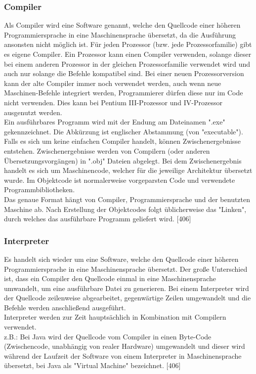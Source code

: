 \documentclass[12pt,a4paper]{report}
\begin{document}
\begin{onehalfspace}
\subsubsection{Compiler}
Als Compiler wird eine Software genannt, welche den Quellcode einer höheren Programmiersprache in eine Maschinensprache übersetzt, da die Ausführung ansonsten nicht möglich ist. Für jeden Prozessor (bzw. jede Prozessorfamilie) gibt es eigene Compiler. Ein Prozessor kann einen Compiler verwenden, solange dieser bei einem anderen Prozessor in der gleichen Prozessorfamilie verwendet wird und auch nur solange die Befehle kompatibel sind. Bei einer neuen Prozessorversion kann der alte Compiler immer noch verwendet werden, auch wenn neue Maschinen-Befehle integriert werden, Programmierer dürfen diese nur im Code nicht verwenden. Dies kann bei Pentium III-Prozessor und IV-Prozessor ausgenutzt werden.\\
Ein ausführbares Programm wird mit der Endung am Dateinamen "{}.exe"{} gekennzeichnet. Die Abkürzung ist englischer Abstammung (von "{}executable"{}).\\
Falls es sich um keine einfachen Compiler handelt, können Zwischenergebnisse entstehen.
Zwischenergebnisse werden von Compilern (oder anderen Übersetzungsvorgängen) in "{}.obj"{} Dateien abgelegt. Bei dem Zwischenergebnis handelt es sich um Maschinencode, welcher für die jeweilige Architektur übersetzt wurde. Im Objektcode ist normalerweise vorgeparsten Code und verwendete Programmbibliotheken.\\
Das genaue Format hängt von Compiler, Programmiersprache und der benutzten Maschine ab.
Nach Erstellung der Objektcodes folgt üblicherweise das "{}Linken"{}, durch welches das ausführbare Programm geliefert wird. [406]

\subsubsection{Interpreter}
Es handelt sich wieder um eine Software, welche den Quellcode einer höheren Programmiersprache in eine Maschinensprache übersetzt. Der große Unterschied ist, dass ein Compiler den Quellcode einmal in eine Maschinensprache umwandelt, um eine ausführbare Datei zu generieren. Bei einem Interpreter wird der Quellcode zeilenweise abgearbeitet, gegenwärtige Zeilen umgewandelt und die Befehle werden anschließend ausgeführt.\\
Interpreter werden zur Zeit hauptsächlich in Kombination mit Compilern verwendet.\\
z.B.: Bei Java wird der Quellcode vom Compiler in einen Byte-Code (Zwischencode, unabhängig von realer Hardware) umgewandelt und dieser wird während der Laufzeit der Software von einem Interpreter in Maschinensprache übersetzt, bei Java als "{}Virtual Machine"{} bezeichnet. [406]


\end{onehalfspace}
\end{document}
